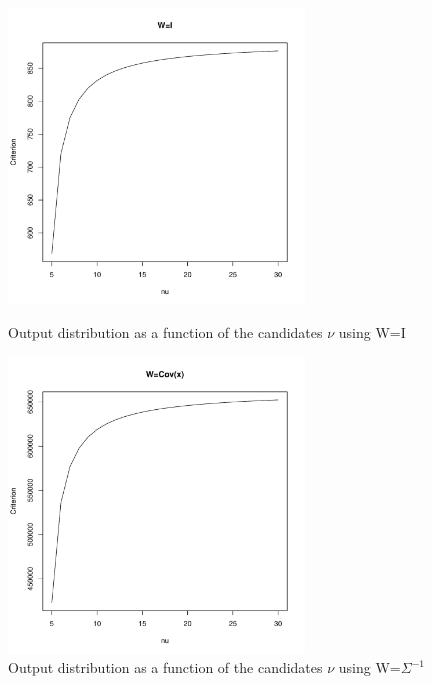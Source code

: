 \newpage

\begin{figure}\label{SP500_returns_criterion}
    \centering
    \includegraphics[width=0.7\textwidth]{S&P500_returns_criterion_(W=I).pdf}
    \caption{Output distribution as a function of the candidates $\nu$ using W=I}
    \includegraphics[width=0.7\textwidth]{S&P500_returns_criterion_(W=Sigma^-1).pdf}
    \caption{Output distribution as a function of the candidates $\nu$ using W=$\Sigma^{-1}$}
\end{figure}

